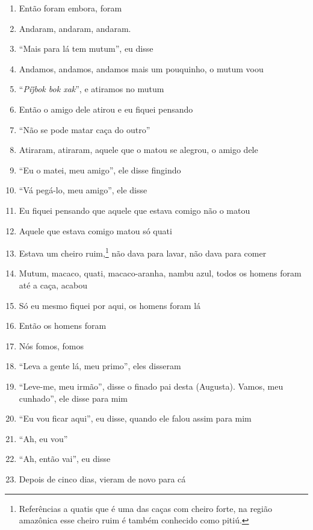 \begin{enumerate}
 \item Então foram embora, foram
 \begin{center}\end{center}
 \item Andaram, andaram, andaram.
 \item ``Mais para lá tem mutum'', eu disse
 \item Andamos, andamos, andamos mais um pouquinho, o mutum voou
 \item ``\textit{Pij̃bok bok xak}'', e atiramos no mutum
 \item Então o amigo dele atirou e eu fiquei pensando
 \item ``Não se pode matar caça do outro''
 \item Atiraram, atiraram, aquele que o matou se alegrou, o amigo dele
 \item ``Eu o matei, meu amigo'', ele disse fingindo
 \item ``Vá pegá-lo, meu amigo'', ele disse
 \item Eu fiquei pensando que aquele que estava comigo não o matou
 \item Aquele que estava comigo matou só quati
 \item Estava um cheiro ruim,\footnote{Referências a quatis que é uma das
   caças com cheiro forte, na região amazônica esse cheiro ruim é também
   conhecido como pitiú.} não dava para lavar, não dava para comer
 \item Mutum, macaco, quati, macaco-aranha, nambu azul, todos os homens
 foram até a caça, acabou
 \item Só eu mesmo fiquei por aqui, os homens foram lá
 \item Então os homens foram
 \begin{center}\end{center}
 \item Nós fomos, fomos
 \item ``Leva a gente lá, meu primo'', eles disseram
 \item ``Leve-me, meu irmão'', disse o finado pai desta (Augusta).  Vamos,
 meu cunhado'', ele disse para mim
 \item ``Eu vou ficar aqui'', eu disse, quando ele falou assim para mim
 \item ``Ah, eu vou''
 \item ``Ah, então vai'', eu disse
 \begin{center}\end{center}
 \item Depois de cinco dias, vieram de novo para cá

\end{enumerate}
